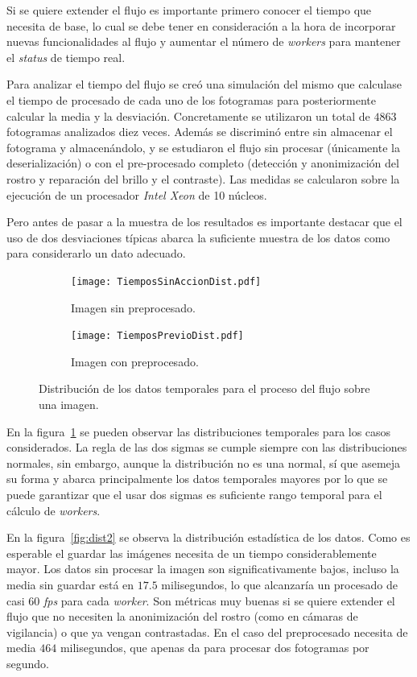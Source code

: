 Si se quiere extender el flujo es importante primero conocer el tiempo que necesita de base, lo cual se debe tener en consideración a la hora de incorporar nuevas funcionalidades al flujo y aumentar el número de \textit{workers} para mantener el \textit{status} de tiempo real.

Para analizar el tiempo del flujo se creó una simulación del mismo que calculase el tiempo de procesado de cada uno de los fotogramas para posteriormente calcular la media y la desviación. Concretamente se utilizaron un total de $4863$ fotogramas analizados diez veces. Además se discriminó entre sin almacenar el fotograma y almacenándolo, y se estudiaron el flujo sin procesar (únicamente la deserialización) o con el pre-procesado completo (detección y anonimización del rostro y reparación del brillo y el contraste). Las medidas se calcularon sobre la ejecución de un procesador \textit{Intel Xeon} de 10 núcleos.

Pero antes de pasar a la muestra de los resultados es importante destacar que el uso de dos desviaciones típicas abarca la suficiente muestra de los datos como para considerarlo un dato adecuado. 

\begin{figure}
	\begin{subfigure}[b]{\textwidth}
		\texttt{[image: TiemposSinAccionDist.pdf]}
		\caption{Imagen sin preprocesado.}
	\end{subfigure}
	\begin{subfigure}[b]{\textwidth}
		\texttt{[image: TiemposPrevioDist.pdf]}
		\caption{Imagen con preprocesado.}
	\end{subfigure}
	\caption{Distribución de los datos temporales para el proceso del flujo sobre una imagen.}
	\label{fig:dist1}
\end{figure}


En la figura~\ref{fig:dist1} se pueden observar las distribuciones temporales para los casos considerados. La regla de las dos sigmas se cumple siempre con las distribuciones normales, sin embargo, aunque la distribución no es una normal, sí que asemeja su forma y abarca principalmente los datos temporales mayores por lo que se puede garantizar que el usar dos sigmas es suficiente rango temporal para el cálculo de \textit{workers}.

En la figura~\ref{fig:dist2} se observa la distribución estadística de los datos. Como es esperable el guardar las imágenes necesita de un tiempo considerablemente mayor. Los datos sin procesar la imagen son significativamente bajos, incluso la media sin guardar está en $17.5$ milisegundos, lo que alcanzaría un procesado de casi $60$ \textit{fps} para cada \textit{worker}. Son métricas muy buenas si se quiere extender el flujo que no necesiten la anonimización del rostro (como en cámaras de vigilancia) o que ya vengan contrastadas. En el caso del preprocesado necesita de media $464$ milisegundos, que apenas da para procesar dos fotogramas por segundo.

